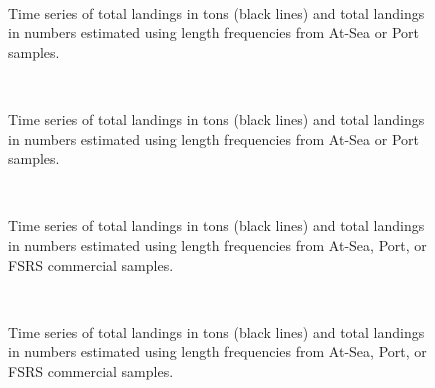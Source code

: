\documentclass[11pt]{article}
\newcommand{\e}{/backup/bio_data/bio.lobster/figures/} %
\begin{document}


\begin{figure}
        \centering
         \\
                    
                    \caption{Time series of total landings in tons (black lines) and total landings in numbers estimated using length frequencies from At-Sea or Port samples.}
        \end{figure}

\begin{figure}
        \centering
         \\
                     \caption{Time series of total landings in tons (black lines) and total landings in numbers estimated using length frequencies from At-Sea or Port samples.}
        \end{figure}

\begin{figure}
        \centering
         \\
                     
                    \caption{Time series of total landings in tons (black lines) and total landings in numbers estimated using length frequencies from At-Sea, Port, or FSRS commercial samples.}
                    
        \end{figure}
\begin{figure}
        \centering
         \\
                     
                    \caption{Time series of total landings in tons (black lines) and total landings in numbers estimated using length frequencies from At-Sea, Port, or FSRS commercial samples.}
                    
        \end{figure}
\end{document}
